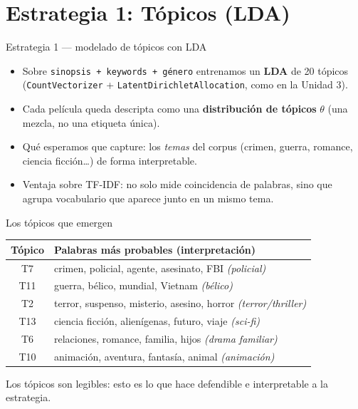 \documentclass[10pt,aspectratio=169]{beamer}
\begin{document}
\section{Estrategia 1: Tópicos (LDA)}

\begin{frame}{Estrategia 1 --- modelado de tópicos con LDA}
  \begin{itemize}
    \item Sobre \texttt{sinopsis + keywords + género} entrenamos un \textbf{LDA} de 20 tópicos (\texttt{CountVectorizer} + \texttt{LatentDirichletAllocation}, como en la Unidad 3).
    \item Cada película queda descripta como una \textbf{distribución de tópicos} $\theta$ (una mezcla, no una etiqueta única).
    \item Qué esperamos que capture: los \emph{temas} del corpus (crimen, guerra, romance, ciencia ficción\dots) de forma interpretable.
    \item Ventaja sobre TF-IDF: no solo mide coincidencia de palabras, sino que agrupa vocabulario que aparece junto en un mismo tema.
  \end{itemize}
\end{frame}

\begin{frame}{Los tópicos que emergen}
  \centering
  \begin{tabular}{c l}
    \toprule
    \textbf{Tópico} & \textbf{Palabras más probables (interpretación)} \\
    \midrule
    T7  & crimen, policial, agente, asesinato, FBI \quad \textit{(policial)} \\
    T11 & guerra, bélico, mundial, Vietnam \quad \textit{(bélico)} \\
    T2  & terror, suspenso, misterio, asesino, horror \quad \textit{(terror/thriller)} \\
    T13 & ciencia ficción, alienígenas, futuro, viaje \quad \textit{(sci-fi)} \\
    T6  & relaciones, romance, familia, hijos \quad \textit{(drama familiar)} \\
    T10 & animación, aventura, fantasía, animal \quad \textit{(animación)} \\
    \bottomrule
  \end{tabular}
  \vspace{0.6em}
  \par\footnotesize Los tópicos son legibles: esto es lo que hace defendible e interpretable a la estrategia.
\end{frame}
\end{document}
